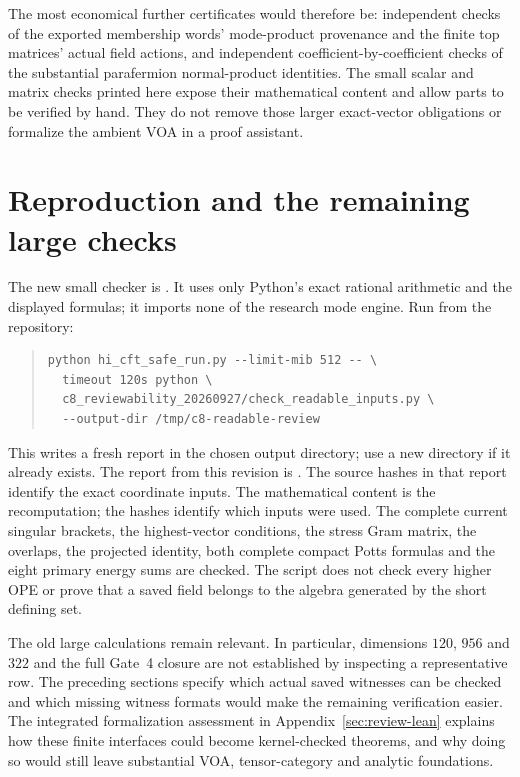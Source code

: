 The most economical further certificates would therefore be:
independent checks of the exported membership words' mode-product
provenance and the finite top matrices' actual field actions, and independent
coefficient-by-coefficient checks of the substantial parafermion
normal-product identities. The small scalar and matrix checks printed
here expose their mathematical content and allow parts to be
verified by hand. They do not remove those larger exact-vector
obligations or formalize the ambient VOA in a proof assistant.


\section{Reproduction and the remaining large checks}
The new small checker is
. It uses
only Python's exact rational arithmetic and the displayed formulas;
it imports none of the research mode engine. Run from the repository:
\begin{quote}\small\begin{verbatim}
python hi_cft_safe_run.py --limit-mib 512 -- \
  timeout 120s python \
  c8_reviewability_20260927/check_readable_inputs.py \
  --output-dir /tmp/c8-readable-review
\end{verbatim}\end{quote}
This writes a fresh report in the chosen output directory; use a new
directory if it already exists. The report from this revision is
.
The source hashes in that report identify the exact coordinate inputs.
The mathematical content is the recomputation; the hashes identify
which inputs were used. The complete current singular brackets,
the highest-vector conditions, the stress Gram matrix, the overlaps,
the projected identity, both complete compact Potts formulas and the
eight primary energy sums are checked.
The script does not check every higher OPE or prove that a saved field
belongs to the algebra generated by the short defining set.

The old large calculations remain relevant. In particular, dimensions
$120$, $956$ and $322$ and the full Gate~4 closure are not established
by inspecting a representative row. The preceding sections specify
which actual saved witnesses can be checked and which missing witness
formats would make the remaining verification easier. The integrated formalization assessment in Appendix~\ref{sec:review-lean} explains how these finite
interfaces could become kernel-checked theorems, and why doing so would
still leave substantial VOA, tensor-category and analytic foundations.
